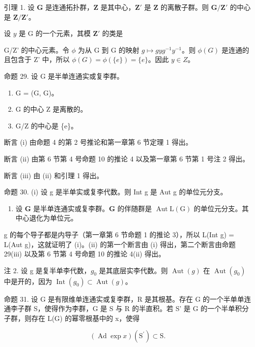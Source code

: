 引理 1. 设 \(\mathbf{G}\) 是连通拓扑群，\(\mathbf{Z}\) 是其中心，\(\mathbf{Z}'\) 是 \(\mathbf{Z}\) 的离散子群。则 \(\mathbf{G}/\mathbf{Z}'\) 的中心是 \(\mathbf{Z}/\mathbf{Z}'\)。

设 \(y\) 是 G 的一个元素，其模 \(\mathbf{Z}'\) 的类是

G/Z' 的中心元素。令 \(\phi\) 为从 G 到 G 的映射 \(g \mapsto gyg^{-1}y^{-1}\)。则 \(\phi(G)\) 是连通的且包含于 Z' 中，所以 \(\phi(G) = \phi(\{e\}) = \{e\}\)。因此 \(y \in Z\)。

命题 29. 设 G 是半单连通实或复李群。

\begin{enumerate}
\def\labelenumi{(\roman{enumi})}
\item
  G = (G, G)。
\item
  G 的中心 Z 是离散的。
\item
  G/Z 的中心是 \{e\}。
\end{enumerate}

断言 (i) 由命题 4 的第 2 号推论和第一章第 6 节定理 1 得出。

断言 (ii) 由第 6 节第 4 号命题 10 的推论 4 以及第一章第 6 节第 1 号注 2 得出。

断言 (iii) 由 (ii) 和引理 1 得出。

命题 30. (i) 设 g 是半单实或复李代数。则 Int g 是 Aut g 的单位元分支。

\begin{enumerate}
\def\labelenumi{(\roman{enumi})}
\setcounter{enumi}{1}
\tightlist
\item
  设 \(\mathbf{G}\) 是半单连通实或复李群。\(\mathbf{G}\) 的伴随群是 \(\operatorname{Aut} \mathrm{L}(\mathrm{G})\) 的单位元分支。其中心退化为单位元。
\end{enumerate}

g 的每个导子都是内导子（第一章第 6 节命题 1 的推论 3），所以 L(Int g) = L(Aut g)，这就证明了 (i)。(ii) 的第一个断言由 (i) 得出，第二个断言由命题 29(iii) 以及第 6 节第 4 号命题 10 的推论 4(ii) 得出。

注 2. 设 g 是复半单李代数，\(g_{0}\) 是其底层实李代数。则 \(\operatorname{Aut}(g)\) 在 \(\operatorname{Aut}(g_{0})\) 中是开的，因为 \(\operatorname{Int}(g_{0}) \subset \operatorname{Aut}(g)\)。

命题 31. 设 G 是有限维单连通实或复李群，R 是其根基。存在 G 的一个半单单连通李子群 S，使得作为李群，G 是 S 与 R 的半直积。若 S' 是 G 的一个半单积分子群，则存在 L(G) 的幂零根基中的 x，使得

\[
(\operatorname{Ad} \exp x) (\mathrm{S} ^ {\prime}) \subset \mathrm{S}.
\]

